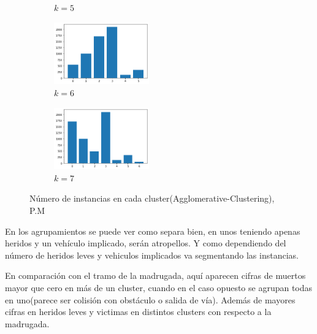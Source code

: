 \begin{figure}[H]
\begin{subfigure}{.5\textwidth}
  \caption{$k=5$}
\end{subfigure}
\begin{subfigure}{.5\textwidth}
  \centering
  \includegraphics[width=0.45\textwidth]{imagenes/counter/pm/agg6.png}
  \caption{$k=6$}
\end{subfigure}
\begin{subfigure}{.5\textwidth}
  \centering
  \includegraphics[width=0.45\textwidth]{imagenes/counter/pm/agg7.png}
  \caption{$k=7$}
\end{subfigure}
\caption{Número de instancias en cada cluster(Agglomerative-Clustering), P.M}
\label{fig:hm-km}
\end{figure}

En los agrupamientos se puede ver como separa bien, en unos teniendo apenas heridos y un vehículo implicado, serán atropellos. Y como dependiendo del número de heridos leves y vehiculos implicados va segmentando las instancias.

En comparación con el tramo de la madrugada, aquí aparecen cifras de muertos mayor que cero en más de un cluster, cuando en el caso opuesto se agrupan todas en uno(parece ser colisión con obstáculo o salida de vía). Además de mayores cifras en heridos leves y victimas en distintos clusters con respecto a la madrugada.


